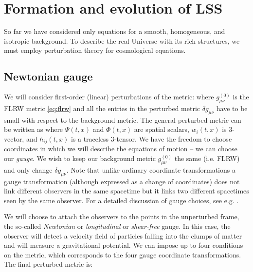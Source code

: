 \section{Formation and evolution of LSS}
So far we have considered only equations for a smooth, homogeneous, and isotropic background. To describe the real Universe with its rich structures, we must employ perturbation theory for cosmological equations.
\subsection{Newtonian gauge}
We will consider first-order (linear) perturbations of the metric:
where $g_{\mu\nu}^{(0)}$ is the FLRW metric \eqref{eq:flrw} and all the entries in the perturbed metric $\delta g_{\mu\nu}$ have to be small with respect to the background metric. The general perturbed metric can be written as
where $\Psi(t,x)$ and $\Phi(t,x)$ are spatial scalars, $w_i(t,x)$ is 3-vector, and $h_{ij}(t,x)$ is a traceless 3-tensor. We have the freedom to choose coordinates in which we will describe the equations of motion -- we can choose our \textit{gauge}. We wish to keep our background metric $g_{\mu\nu}^{(0)}$ the same (i.e. FLRW) and only change $\delta g_{\mu\nu}$. Note that unlike ordinary coordinate transformations a gauge transformation (although expressed as a change of coordinates) does not link different observers in the same spacetime but it links two different spacetimes seen by the same observer. For a detailed discussion of gauge choices, see e.g. \textcite{PhysRevD.40.1804,10.1143/PTPS.78.1,PhysRevD.22.1882}.

We will choose to attach the observers to the points in the unperturbed frame, the so-called \textit{Newtonian} or \textit{longitudinal} or \textit{shear-free} gauge. In this case, the observer will detect a velocity field of particles falling into the clumps of matter and will measure a gravitational potential. We can impose up to four conditions on the metric, which corresponds to the four gauge coordinate transformations. The final perturbed metric is:
